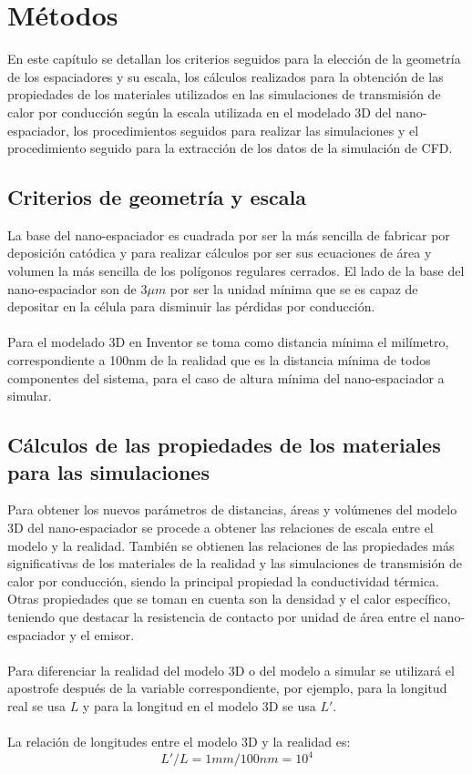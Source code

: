 \chapter{Métodos}\label{chapter:Metodos}
En este capítulo se detallan los criterios seguidos para la elección de la geometría de los espaciadores y su escala, los cálculos realizados para la obtención de las propiedades de los materiales utilizados en las simulaciones de transmisión de calor por conducción según la escala utilizada en el modelado 3D del nano-espaciador, los procedimientos seguidos para realizar las simulaciones y el procedimiento seguido para la extracción de los datos de la simulación de CFD.
\section{Criterios de geometría y escala} 
La base del nano-espaciador es cuadrada por ser la más sencilla de fabricar por deposición catódica y para realizar cálculos por ser sus ecuaciones de área y volumen la más sencilla de los polígonos regulares cerrados. El lado de la base del nano-espaciador son de 3$\mu m$ por ser la unidad mínima que se es capaz de depositar en la célula para disminuir las pérdidas por conducción.\\\\
Para el modelado 3D en Inventor se toma como distancia mínima el milímetro, correspondiente a 100nm de la realidad que es la distancia mínima de todos componentes del sistema, para el caso de altura mínima del nano-espaciador a simular.
\section{Cálculos de las propiedades de los materiales para las simulaciones}
Para obtener los nuevos parámetros de distancias, áreas y volúmenes del modelo 3D del nano-espaciador se procede a obtener las relaciones de escala entre el modelo y la realidad. También se obtienen las relaciones de las propiedades más significativas de los materiales de la realidad y las simulaciones de transmisión de calor por conducción, siendo la principal propiedad la conductividad térmica. Otras propiedades que se toman en cuenta son la densidad y el calor específico, teniendo que destacar la resistencia de contacto por unidad de área entre el nano-espaciador y el emisor.\\\\
Para diferenciar la realidad del modelo 3D o del modelo a simular se utilizará el apostrofe después de la variable correspondiente, por ejemplo, para la longitud real se usa $L$ y para la longitud en el modelo 3D se usa $L'$.\\\\
La relación de longitudes entre el modelo 3D y la realidad es:
\begin{equation}
{L'}/{L}={1mm}/{100nm}=10^4
\label{eq:relacion_longitud}
\end{equation}
